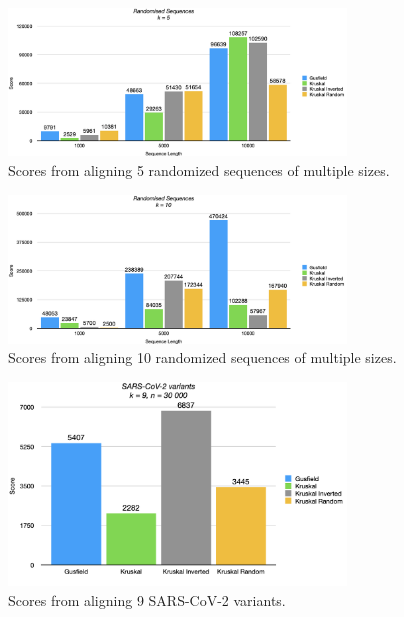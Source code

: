 \documentclass[twoside,openright,titlepage,numbers=noenddot,headinclude,%
                footinclude=true,cleardoublepage=empty,abstractoff, %
                BCOR=5mm,paper=a4,fontsize=11pt,%
                ngerman,american,%
                ]{scrreprt}
\begin{document}
\begin{figure}[H]
\includegraphics[width=0.8\textwidth]{report/chart-2.png}
\centering
\caption{Scores from aligning 5 randomized sequences of multiple sizes.}
\label{fig:chart-2}
\end{figure}

\begin{figure}[H]
\includegraphics[width=0.8\textwidth]{report/chart-3.png}
\centering
\caption{Scores from aligning 10 randomized sequences of multiple sizes.}
\label{fig:chart-3}
\end{figure}

\begin{figure}[H]
\includegraphics[width=0.8\textwidth]{report/chart-4.png}
\centering
\caption{Scores from aligning 9 SARS-CoV-2 variants.}
\label{fig:chart-4}
\end{figure}
\end{document}
